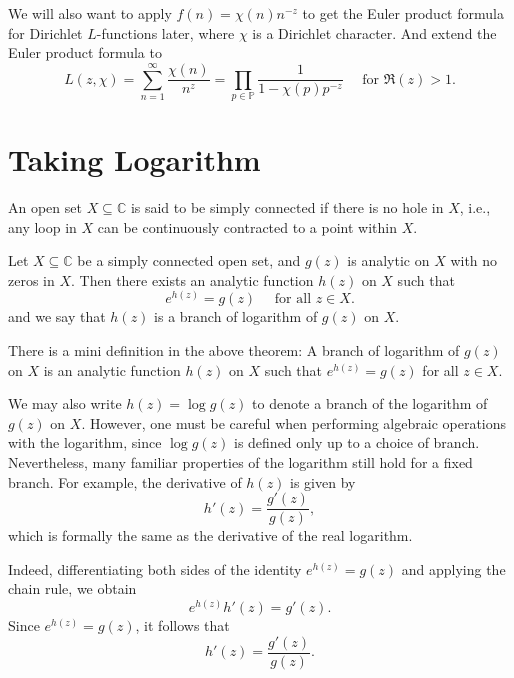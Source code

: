\documentclass{elegantbook}
\begin{document}
\begin{remark}
  We will also want to apply $f(n)=\chi(n)n^{-z}$ to get the Euler product formula for Dirichlet $L$-functions later, where $\chi$ is a Dirichlet character.
  And extend the Euler product formula to
  \[
    L(z, \chi) = \sum_{n=1}^{\infty} \frac{\chi(n)}{n^z} = \prod_{p\in\mathbb{P}} \frac{1}{1 - \chi(p)p^{-z}} \quad \text{ for } \Re(z)>1.
  \]
\end{remark}


\section{Taking Logarithm}

\begin{definition}
  An open set $X \subseteq \mathbb{C}$ is said to be simply connected if there is no hole in $X$, i.e., any loop in $X$ can be continuously contracted to a point within $X$.
\end{definition}

\begin{theorem} \label{thm:existence_log_branch}
  Let $X \subseteq \mathbb{C}$ be a simply connected open set, and $g(z)$ is analytic on $X$ with no zeros in $X$. Then there exists an analytic function $h(z)$ on $X$ such that
  \[
    e^{h(z)} = g(z) \quad \text{ for all } z \in X.
  \]
  and we say that $h(z)$ is a branch of logarithm of $g(z)$ on $X$.
\end{theorem}

\begin{note}
  There is a mini definition in the above theorem: A branch of logarithm of $g(z)$ on $X$ is an analytic function $h(z)$ on $X$ such that $e^{h(z)} = g(z)$ for all $z \in X$.
\end{note}

\begin{note}
    We may also write $h(z) = \log g(z)$ to denote a branch of the logarithm of $g(z)$ on $X$. However, one must be careful when performing algebraic operations with the logarithm, since $\log g(z)$ is defined only up to a choice of branch.
    Nevertheless, many familiar properties of the logarithm still hold for a fixed branch. For example, the derivative of $h(z)$ is given by
    \[
      h'(z) = \frac{g'(z)}{g(z)},
    \]
    which is formally the same as the derivative of the real logarithm.

    Indeed, differentiating both sides of the identity $e^{h(z)} = g(z)$ and applying the chain rule, we obtain
    \[
      e^{h(z)} h'(z) = g'(z).
    \]
    Since $e^{h(z)} = g(z)$, it follows that
    \[
      h'(z) = \frac{g'(z)}{g(z)}.
  \]
\end{note}
\end{document}
